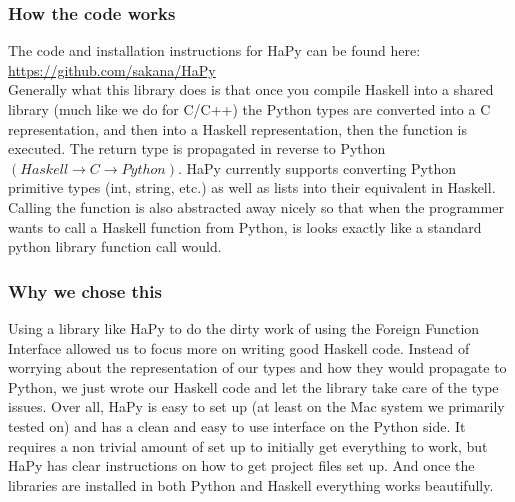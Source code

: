 \documentclass[12pt]{article}
\begin{document}
        \subsubsection{How the code works}
            The code and installation instructions for HaPy can be
            found here: \\ \url{https://github.com/sakana/HaPy} \\
            Generally what this library does is that once you compile Haskell into a
            shared library (much like we do for C/C++) the Python types are converted into
            a C representation, and then into a Haskell representation, then the function is
            executed. The return type is propagated in reverse to Python 
            $(Haskell \rightarrow C \rightarrow Python)$.
            HaPy currently supports converting Python primitive types (int, string, etc.) 
            as well as lists into their equivalent in Haskell. Calling the function is also
            abstracted away nicely so that when the programmer wants to call a Haskell 
            function from Python, is looks exactly like a standard python library
            function call would.
            
        \subsubsection{Why we chose this}
            Using a library like HaPy to do the dirty work of using the Foreign Function Interface
            allowed us to focus more on writing good Haskell code. Instead of worrying about 
            the representation of our types and how they would propagate to Python, we just wrote
            our Haskell code and let the library take care of the type issues. Over all, HaPy is
            easy to set up (at least on the Mac system we primarily tested on) and has a clean
            and easy to use interface on the Python side. It requires a non trivial amount
            of set up to initially get everything to work, but HaPy has clear instructions
            on how to get project files set up. And once the libraries are installed in both
            Python and Haskell everything works beautifully.
            
\end{document}
